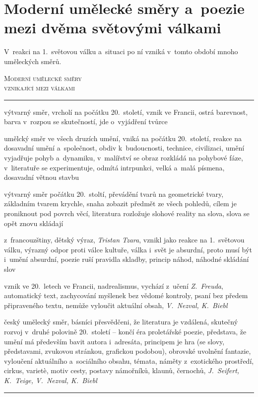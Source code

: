\chapter[Moderní umělecké směry mezi světovými válkami]{Moderní umělecké směry a~poezie mezi dvěma světovými válkami} 
V~reakci na 1.~světovou válku a~situaci po ní vzniká v~tomto období
mnoho uměleckých směrů.

\begin{center}
\textsc{\Large
Moderní umělecké směry\\
vznikající mezi válkami
}
\end{center}
\vspace{3mm}
\begin{description}
\hrule
\vspace{-1mm}

\item[fauvismus] výtvarný směr, vrcholí na počátku 20.~století, vznik ve Francii,
ostrá barevnost, barva v~rozpou se skutečností, jde o~vyjádření tvůrce
\item[futurismus] umělcký směr ve všech druzích umění, vniká na počátku
20.~století, reakce na dosavadní umění a~společnost, obdiv k~budoucnosti,
technice, civilizaci, umění vyjadřuje pohyb a~dynamiku, v~malířství
se obraz rozkládá na pohybové fáze, v~literatuře se experimentuje,
odmítá intrpunkci, velká a~malá písmena, dosavadní větnou stavbu
\item[kubismus] výtvarný směr počátku 20.~stoltí, převádění tvarů 
na geometrické tvary, základním tvarem krychle, snaha zobazit předmět
ze všech pohledů, cílem je proniknout pod povrch věcí, literatura rozložuje
slohové reality na slova, slova se opět znovu skládají
\item[dadaismus] z~francouzštiny, dětský výraz, \emph{Tristan Tzara},
vznikl jako reakce na 1.~světovou válku, výrazný odpor proti válce
kultuře, válka i~svět je absurdní, proto musí být i~umění absurdní,
poezie ruší pravidla skladby, princip náhod, náhodné skládání slov
\item[surrealismus] vznik ve 20.~letech ve Francii, nadrealismus,
vychází z~učení \emph{Z.~Freuda}, automatický text, zachycování myšlenek
bez vědomé kontroly, psaní bez předem připraveného textu, nemůže vyloučit
aktuální obsah, \emph{V.~Nezval, K.~Biebl}
\item[poetismus] český umělecký směr, básníci přesvědčeni, že literatura je
vzdálená, skutečný rozvoj v~druhé polovině 20.~století -- končí éra proletářské
poezie, představa, že umění má především bavit autora i~adresáta,
principem je hra (se slovy, představami, zvukovou stránkou, grafickou podobou),
obrovské uvolnění fantazie, vyloučení aktuálního a~sociálního obsahu,
témata, náměty z~exotického prostředí, cirkus, variet\`e, motiv
cesty, postavy námořníků, klaunů, černochů, \emph{J.~Sei\-fert, \hbox{K.~Teige}, V.~Nezval, \hbox{K.~Biebl}}
\hrule 
\end{description}

